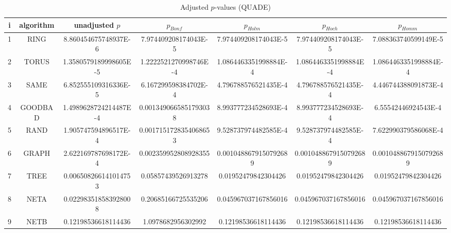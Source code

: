 \documentclass[a4paper,10pt]{article}
\begin{document}
\begin{landscape}
\begin{table}[!htp]
\centering\scriptsize
\caption{Adjusted $p$-values (QUADE)}
\begin{tabular}{ccccccc}
i&algorithm&unadjusted $p$&$p_{Bonf}$&$p_{Holm}$&$p_{Hoch}$&$p_{Homm}$\\
\hline
1& RING&8.860454675748937E-6&7.974409208174043E-5&7.974409208174043E-5&7.974409208174043E-5&7.088363740599149E-5\\
2& TORUS&1.3580579189998605E-5&1.2222521270998746E-4&1.0864463351998884E-4&1.0864463351998884E-4&1.0864463351998884E-4\\
3& SAME&6.852555109316336E-5&6.167299598384702E-4&4.796788576521435E-4&4.796788576521435E-4&4.446744388091873E-4\\
4& GOODBAD&1.4989628724214487E-4&0.0013490665851793038&8.993777234528693E-4&8.993777234528693E-4&6.55542446924543E-4\\
5& RAND&1.905747594896517E-4&0.0017151728354068653&9.528737974482585E-4&9.528737974482585E-4&7.622990379586068E-4\\
6& GRAPH&2.622169787698172E-4&0.002359952808928355&0.0010488679150792689&0.0010488679150792689&0.0010488679150792689\\
7& TREE&0.006508266141014753&0.05857439526913278&0.01952479842304426&0.01952479842304426&0.01952479842304426\\
8& NETA&0.022983518583928008&0.20685166725535206&0.045967037167856016&0.045967037167856016&0.045967037167856016\\
9& NETB&0.12198536618114436&1.0978682956302992&0.12198536618114436&0.12198536618114436&0.12198536618114436\\
\hline
\end{tabular}
\end{table}


\end{landscape}
\end{document}
